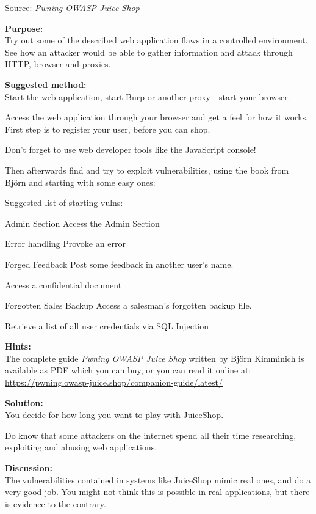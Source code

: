 \documentclass[a4paper,11pt,notitlepage]{report}
\begin{document}
Source: \emph{Pwning OWASP Juice Shop}


 {\bf Purpose:}\\
 Try out some of the described web application flaws in a controlled environment. See how an attacker would be able to gather information and attack through HTTP, browser and proxies.

 {\bf Suggested method:}\\
Start the web application, start Burp or another proxy - start your browser.

Access the web application through your browser and get a feel for how it works. First step is to register your user, before you can shop.

Don't forget to use web developer tools like the JavaScript console!

Then afterwards find and try to exploit vulnerabilities, using the book from Björn and starting with some easy ones:

Suggested list of starting vulns:
\begin{list2}
\item Admin Section Access the Admin Section
\item Error handling Provoke an error
\item Forged Feedback Post some feedback in another user's name.
\item Access a confidential document
\item Forgotten Sales Backup Access a salesman's forgotten backup file.
\item Retrieve a list of all user credentials via SQL Injection
\end{list2}


 {\bf Hints:}\\
 The complete guide \emph{Pwning OWASP Juice Shop}
written by Björn Kimminich is available as PDF which you can buy, or you can read it online at:\\
\url{https://pwning.owasp-juice.shop/companion-guide/latest/}

 {\bf Solution:}\\
 You decide for how long you want to play with JuiceShop.

 Do know that some attackers on the internet spend all their time researching, exploiting and abusing web applications.

 {\bf Discussion:}\\
The vulnerabilities contained in systems like JuiceShop mimic real ones, and do a very good job. You might not think this is possible in real applications, but there is evidence to the contrary.
\end{document}
